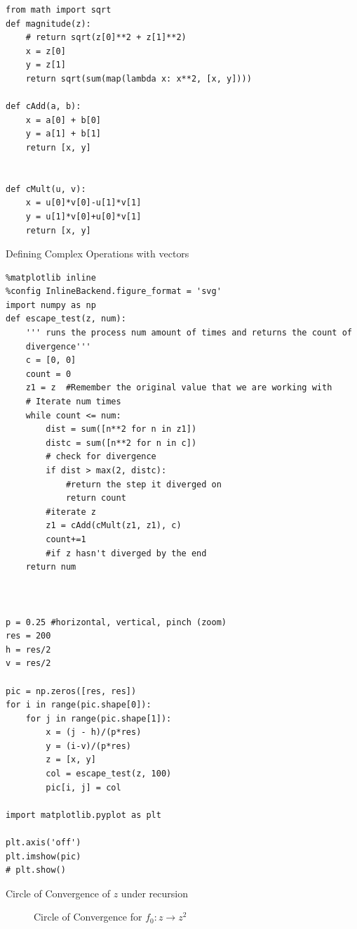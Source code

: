 \documentclass[11pt]{article}
\begin{document}
\begin{listing}[htbp]
\begin{verbatim}
from math import sqrt
def magnitude(z):
    # return sqrt(z[0]**2 + z[1]**2)
    x = z[0]
    y = z[1]
    return sqrt(sum(map(lambda x: x**2, [x, y])))

def cAdd(a, b):
    x = a[0] + b[0]
    y = a[1] + b[1]
    return [x, y]


def cMult(u, v):
    x = u[0]*v[0]-u[1]*v[1]
    y = u[1]*v[0]+u[0]*v[1]
    return [x, y]
\end{verbatim}
\caption{\label{complex-vec}Defining Complex Operations with vectors}
\end{listing}

\begin{listing}[htbp]
\begin{verbatim}
%matplotlib inline
%config InlineBackend.figure_format = 'svg'
import numpy as np
def escape_test(z, num):
    ''' runs the process num amount of times and returns the count of
    divergence'''
    c = [0, 0]
    count = 0
    z1 = z  #Remember the original value that we are working with
    # Iterate num times
    while count <= num:
        dist = sum([n**2 for n in z1])
        distc = sum([n**2 for n in c])
        # check for divergence
        if dist > max(2, distc):
            #return the step it diverged on
            return count
        #iterate z
        z1 = cAdd(cMult(z1, z1), c)
        count+=1
        #if z hasn't diverged by the end
    return num



p = 0.25 #horizontal, vertical, pinch (zoom)
res = 200
h = res/2
v = res/2

pic = np.zeros([res, res])
for i in range(pic.shape[0]):
    for j in range(pic.shape[1]):
        x = (j - h)/(p*res)
        y = (i-v)/(p*res)
        z = [x, y]
        col = escape_test(z, 100)
        pic[i, j] = col

import matplotlib.pyplot as plt

plt.axis('off')
plt.imshow(pic)
# plt.show()

\end{verbatim}
\caption{\label{py-circle-code}Circle of Convergence of \(z\) under recursion}
\end{listing}


\begin{figure}[htbp]
\centering

\caption{\label{py-circle-plot}Circle of Convergence for \(f_{0}: z \rightarrow z^{2}\)}
\end{figure}
\end{document}
